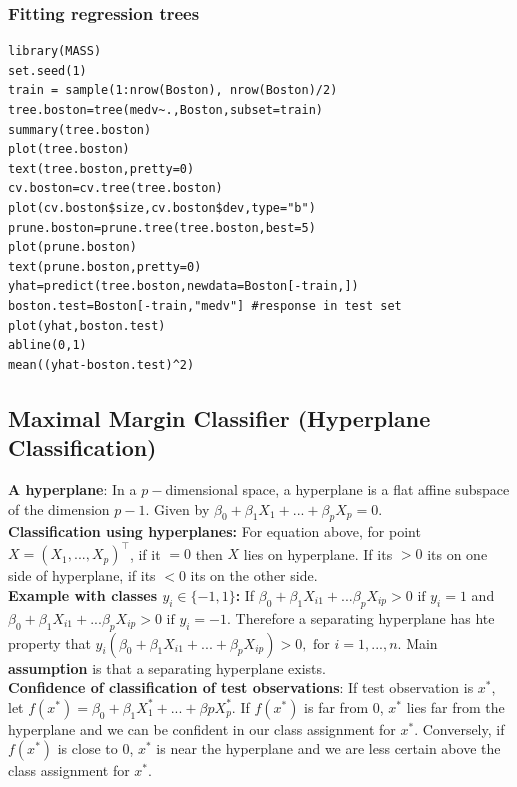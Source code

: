 \documentclass[11pt]{article}
\begin{document}
\subsubsection{Fitting regression trees}
\begin{lstlisting}
library(MASS)
set.seed(1)
train = sample(1:nrow(Boston), nrow(Boston)/2)
tree.boston=tree(medv~.,Boston,subset=train)
summary(tree.boston)
plot(tree.boston)
text(tree.boston,pretty=0)
cv.boston=cv.tree(tree.boston)
plot(cv.boston$size,cv.boston$dev,type="b")
prune.boston=prune.tree(tree.boston,best=5)
plot(prune.boston)
text(prune.boston,pretty=0)
yhat=predict(tree.boston,newdata=Boston[-train,])
boston.test=Boston[-train,"medv"] #response in test set
plot(yhat,boston.test)
abline(0,1)
mean((yhat-boston.test)^2)
\end{lstlisting}

\subsection{Maximal Margin Classifier (Hyperplane Classification)}
\noindent \textbf{A hyperplane}: In a $p-$dimensional space, a hyperplane is a flat affine subspace of the dimension $p-1$. Given by $\beta_{0} + \beta_{1}X_1 +...+\beta_{p}X_p = 0$. \\

\noindent \textbf{Classification using hyperplanes:} For equation above, for point $X = (X_1,...,X_p)^{\top}$, if it $= 0$ then $X$ lies on hyperplane. If its $> 0$ its on one side of hyperplane, if its $< 0$ its on the other side. \\

\noindent \textbf{Example with classes $y_i \in \{ -1,1 \}$:} If $\beta_{0} + \beta_{1}X_{i1} + ... \beta_{p}X_{ip} > 0 \text{ if } y_i = 1$ and $\beta_{0} + \beta_{1}X_{i1} + ... \beta_{p}X_{ip} > 0 \text{ if } y_i = -1$. Therefore a separating hyperplane has hte property that $y_i(\beta_0 + \beta_1 X_{i1} + ... + \beta_p X_{ip}) > 0, \text{ for } i=1,...,n$. Main \textbf{assumption} is that a separating hyperplane exists. \\

\noindent \textbf{Confidence of classification of test observations}: If test observation is $x^*$, let $f(x^*) = \beta_{0} + \beta_{1}X_1^* + ... + \beta{p}X_{p}^*$. If $f(x^*)$ is far from $0$, $x^*$ lies far from the hyperplane and we can be confident in our class assignment for $x^*$. Conversely, if $f(x^*)$ is close to $0$, $x^*$ is near the hyperplane and we are less certain above the class assignment for $x^*$. \\
\end{document}
